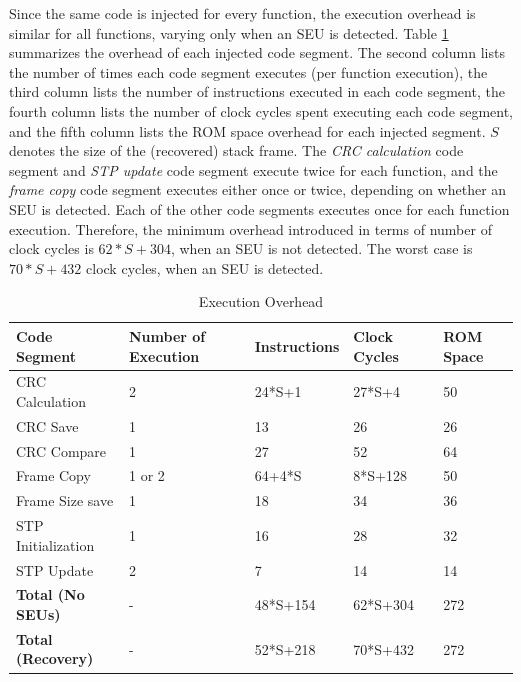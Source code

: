 Since the same code is injected for every function, the execution overhead is similar for all functions, varying only when an SEU is detected. Table \ref{tbl_speed_overhead} summarizes the overhead of each injected code segment. The second column lists the number of times each code segment executes (per function execution), the third column lists the number of instructions executed in each code segment, the fourth column lists the number of clock cycles spent executing each code segment, and the fifth column lists the ROM space overhead for each injected segment. $S$ denotes the size of the (recovered) stack frame. The \textit{CRC calculation} code segment and \textit{STP update} code segment execute twice for each function, and the \textit{frame copy} code segment executes either once or twice, depending on whether an SEU is detected. Each of the other code segments executes once for each function execution. Therefore, the minimum overhead introduced in terms of number of clock cycles is $62*S+304$, when an SEU is not detected. The worst case is $70*S+432$ clock cycles, when an SEU is detected. 
\vspace{-15pt}
\begin{table}
	\center
    \begin{tabular}{|l|p{1.8cm}|p{2cm}|p{1.5cm}|p{1.5cm}|}
    \hline
   \textbf{Code Segment}   & \textbf{Number of Execution} & \textbf{Instructions} & \textbf{Clock Cycles} & \textbf{ROM Space}	\\ \hline
    CRC Calculation         & 2			& 24*S+1		& 27*S+4		& 50				\\ \hline
    CRC Save                & 1			& 13			& 26           	& 26				\\ \hline
    CRC Compare             & 1			& 27			& 52		   	& 64				\\ \hline
    Frame Copy				& 1 or 2	& 64+4*S		& 8*S+128      	& 50				\\ \hline
    Frame Size save         & 1			& 18			& 34           	& 36				\\ \hline
    STP Initialization		& 1			& 16			& 28		   	& 32				\\ \hline
	STP Update				& 2			& 7				& 14			& 14				\\ \hline
	\textbf{Total (No SEUs)} & -	 	& 48*S+154     	& 62*S+304		& 272  		\\ \hline
	\textbf{Total (Recovery)}& -	 		& 52*S+218     	& 70*S+432		& 272 		\\ \hline
    \end{tabular}
	\vspace{5pt}
    \caption {Execution Overhead}
    \label{tbl_speed_overhead}
\end{table}

